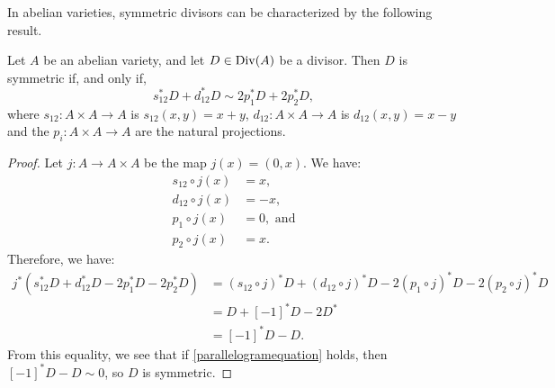 In abelian varieties, symmetric divisors can be characterized by the following result.
\begin{proposition}\label{abeliansymmetric}
	Let $A$ be an abelian variety, and let $D\in\operatorname{Div}(A)$ be a divisor. Then $D$ is symmetric if, and only if,
	\begin{equation}\label{parallelogramequation}
		s_{12}^*D+d_{12}^*D\sim2p_1^*D+2p_2^*D,
	\end{equation}
	where $s_{12}:A\times A\rightarrow A$ is $s_{12}(x,y)=x+y$, $d_{12}:A\times A\rightarrow A$ is $d_{12}(x,y)=x-y$ and the $p_i:A\times A\rightarrow A$ are the natural projections.
\end{proposition}
\begin{proof}
	Let $j:A\rightarrow A\times A$ be the map $j(x)=(0,x)$. We have:
	\begin{align*}
		s_{12}\circ j(x)&=x,\\
		d_{12}\circ j(x)&=-x,\\
		p_1\circ j(x)&=0,\text{ and}\\
		p_2\circ j(x)&=x.
	\end{align*}
	Therefore, we have:
	\begin{align*}
		j^*(s_{12}^*D+d_{12}^*D-2p_1^*D-2p_2^*D)&=(s_{12}\circ j)^*D+(d_{12}\circ j)^*D-2(p_1\circ j)^*D-2(p_2\circ j)^*D\\
		&=D+[-1]^*D-2D^*\\
		&=[-1]^*D-D.
	\end{align*}
	From this equality, we see that if \eqref{parallelogramequation} holds, then $[-1]^*D-D\sim 0$, so $D$ is symmetric.
	

\end{proof}
